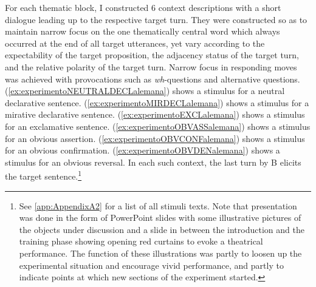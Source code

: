 For each thematic block, I constructed 6 context descriptions with a short dialogue leading up to the respective target turn. They were constructed so as to maintain narrow focus on the one thematically central word which always occurred at the end of all target utterances, yet vary according to the expectability of the target proposition, the adjacency status of the target turn, and the relative polarity of the target turn. Narrow focus in responding moves was achieved with provocations such as \textit{wh}-questions and alternative questions. (\ref{ex:experimentoNEUTRALDECLalemana}) shows a stimulus for a neutral declarative sentence. (\ref{ex:experimentoMIRDECLalemana}) shows a stimulus for a mirative declarative sentence. (\ref{ex:experimentoEXCLalemana}) shows a stimulus for an exclamative sentence. (\ref{ex:experimentoOBVASSalemana}) shows a stimulus for an obvious assertion. (\ref{ex:experimentoOBVCONFalemana}) shows a stimulus for an obvious confirmation. (\ref{ex:experimentoOBVDENalemana}) shows a stimulus for an obvious reversal. In each such context, the last turn by B elicits the target sentence.\footnote{See \autoref{app:AppendixA2} for a list of all stimuli texts. Note that presentation was done in the form of PowerPoint slides with some illustrative pictures of the objects under discussion and a slide in between the introduction and the training phase showing opening red curtains to evoke a theatrical performance. The function of these illustrations was partly to loosen up the experimental situation and encourage vivid performance, and partly to indicate points at which new sections of the experiment started.}


